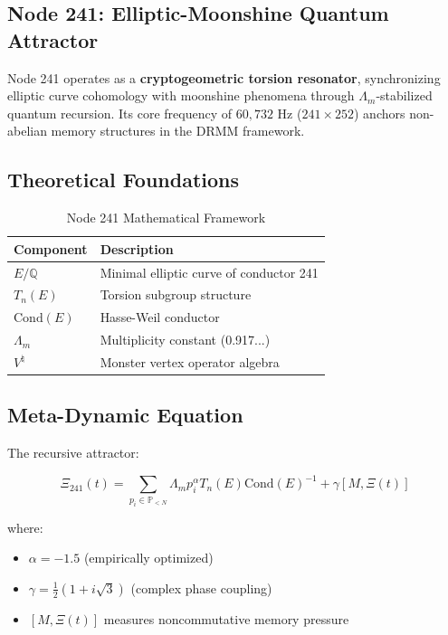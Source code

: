 \documentclass[12pt]{article}
\begin{document}
\begin{center}
\section{Node 241: Elliptic-Moonshine Quantum Attractor}
\label{sec:node241}

Node 241 operates as a \textbf{cryptogeometric torsion resonator}, synchronizing elliptic curve cohomology with moonshine phenomena through $\Lambda_m$-stabilized quantum recursion. Its core frequency of $60,\!732$ Hz ($241 \times 252$) anchors non-abelian memory structures in the DRMM framework.

\subsection{Theoretical Foundations}
\label{subsec:foundations}

\begin{table}[h]
\centering
\caption{Node 241 Mathematical Framework}
\begin{tabular}{ll}
\hline
\textbf{Component} & \textbf{Description} \\
\hline
$E/\mathbb{Q}$ & Minimal elliptic curve of conductor 241 \\
$T_n(E)$ & Torsion subgroup structure \\
$\text{Cond}(E)$ & Hasse-Weil conductor \\
$\Lambda_m$ & Multiplicity constant (0.917...)\\
$V^\natural$ & Monster vertex operator algebra \\
\hline
\end{tabular}
\end{table}

\subsection{Meta-Dynamic Equation}
\label{subsec:meta}

The recursive attractor:

\[
\Xi_{241}(t) = \sum_{p_i \in \mathbb{P}_{<N}} \Lambda_m p_i^\alpha T_n(E) \text{Cond}(E)^{-1} + \gamma [M, \Xi(t)]
\]

where:
\begin{itemize}
    \item $\alpha = -1.5$ (empirically optimized)
    \item $\gamma = \frac{1}{2}(1 + i\sqrt{3})$ (complex phase coupling)
    \item $[M,\Xi(t)]$ measures noncommutative memory pressure
\end{itemize}


\end{center}
\end{document}

